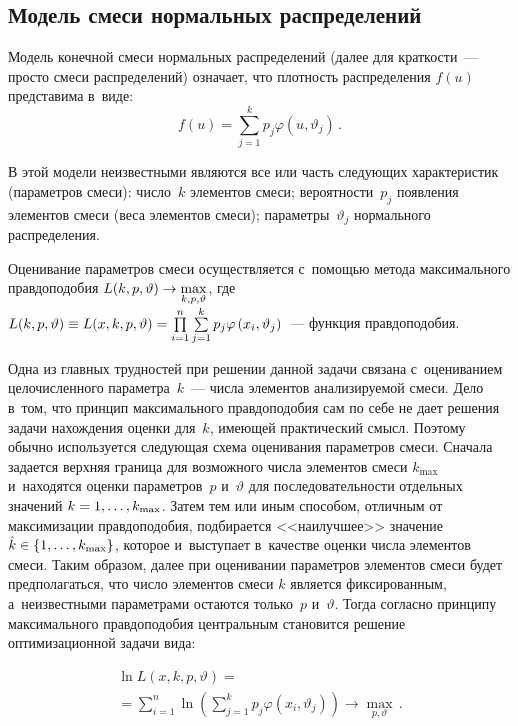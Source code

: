 \begin{multicols}{2}
\section{Модель смеси нормальных распределений}

     Модель конечной смеси нормальных распределений (далее для
краткости~--- просто смеси распределений) означает, что плотность
распределения $f(u)$ представима в~виде:
     $$
     f(u)= \sum\limits_{j=1}^k p_j \varphi\left( u,\vartheta_j\right)\,.
     $$

     В этой модели неизвестными являются все или часть следующих
характеристик (параметров смеси): число~$k$ элементов смеси;
вероятности~$p_j$ появления элементов смеси (веса элементов смеси);
параметры~$\vartheta_j$ нормального распределения.

     Оценивание параметров смеси осуществляется с~помощью метода
максимального правдоподобия
     $
     L(k,p,\vartheta)\hm\to \max\limits_{k,p,\vartheta}$,
где $L(k,p,\vartheta)\equiv L(x,k,p,\vartheta) \hm= \prod\limits_{i=1}^n
\sum\limits_{j=1}^k p_j \varphi\left( x_i,\vartheta_j\right)$~--- функция
правдоподобия.

     Одна из главных трудностей при решении данной задачи связана с~оцениванием целочисленного параметра~$k$~--- числа элементов
анализируемой смеси. Дело в~том, что принцип максимального правдоподобия
сам по себе не дает решения задачи нахождения оценки для~$k$, имеющей
практический смысл. Поэтому обычно используется следующая схема
оценивания параметров смеси. Сначала задается верхняя граница для
возможного числа элементов смеси $k_{\max}$ и~находятся оценки
параметров~$p$ и~$\vartheta$ для последовательности отдельных значений\linebreak
$k\hm= 1,\ldots, k_{\max}$. Затем тем или иным способом, отличным от
максимизации правдоподобия, подбирается <<наилучшее>> значение
$\hat{k}\hm\in \left\{ 1,\ldots, k_{\max}\right\}$,\linebreak
 которое и~выступает в~качестве
оценки числа элемен\-тов смеси. Таким образом, далее при оценивании
параметров элементов смеси будет пред\-по\-лагаться, что число элементов смеси
$k$ является фиксированным, а~неизвестными параметрами остаются
только~$p$ и~$\vartheta$. Тогда согласно принципу максимального
правдоподобия центральным становится решение оптимизационной задачи
вида:

\vspace*{-3pt}

\noindent
     \begin{multline}
     \ln L(x,k,p,\vartheta) ={}\\
     {}= \sum\limits_{i=1}^n \ln \left( \sum\limits_{j=1}^k p_j
\varphi\left( x_i,\vartheta_j\right) \right) \to \max\limits_{p,\vartheta} \,.
     \label{e1-kri}
     \end{multline}


\end{multicols}
